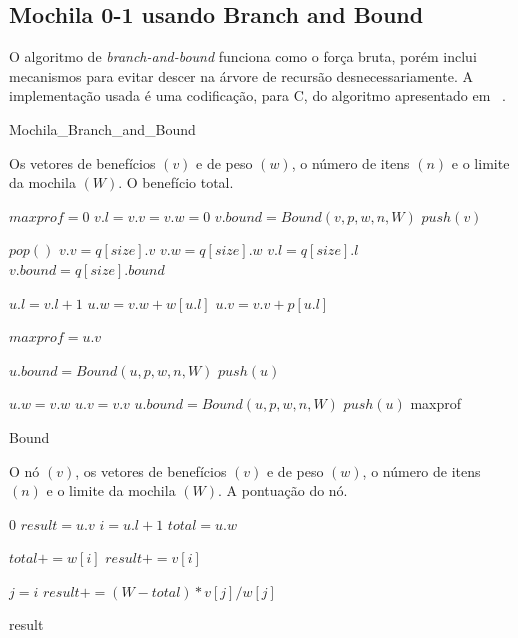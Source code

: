 \subsection{Mochila 0-1 usando Branch and Bound}

O algoritmo de \textit{branch-and-bound} funciona como o força bruta, porém inclui mecanismos para evitar descer na árvore de recursão desnecessariamente. A implementação usada é uma codificação, para C, do algoritmo apresentado em ~\cite{MTG02}.

\begin{algorithm}
\caption{Mochila\_Branch\_and\_Bound} %
\label{alg3}
\scriptsize
\begin{algorithmic}[1]

  \REQUIRE Os vetores de benefícios $(v)$ e de peso $(w)$, o número de itens $(n)$ e o limite da mochila $(W)$.
	\ENSURE O benefício total.

	\STATE $maxprof = 0$
  \STATE $v.l = v.v = v.w = 0$
  \STATE $v.bound = Bound(v, p, w, n, W)$
  \STATE $push(v)$


    \STATE $pop()$
    \STATE $v.v = q[size].v$
    \STATE $v.w = q[size].w$
    \STATE $v.l = q[size].l$
    \STATE $v.bound = q[size].bound$

      \STATE $u.l = v.l + 1$
      \STATE $u.w = v.w + w[u.l]$
      \STATE $u.v = v.v + p[u.l]$

				\STATE $maxprof = u.v$
			\ENDIF

      \STATE $u.bound = Bound(u, p, w, n, W)$
				\STATE $push(u)$
			\ENDIF

      \STATE $u.w = v.w$
      \STATE $u.v = v.v$
      \STATE $u.bound = Bound(u, p, w, n, W)$
				\STATE $push(u)$
			\ENDIF
    \ENDIF
  \ENDWHILE
  \RETURN maxprof

\end{algorithmic}
\end{algorithm}

\begin{algorithm}
\caption{Bound} %
\label{alg4}
\scriptsize
\begin{algorithmic}[1]
	\REQUIRE O nó $(v)$, os vetores de benefícios $(v)$ e de peso $(w)$, o número de itens $(n)$ e o limite da mochila $(W)$.
	\ENSURE A pontuação do nó.

    \RETURN $0$
  \ELSE
    \STATE $result = u.v$
    \STATE $i = u.l + 1$
    \STATE $total = u.w$

      \STATE $total += w[i]$
      \STATE $result += v[i]$
    \ENDWHILE

    \STATE $j = i$
			\STATE $result += (W - total) * v[j]/w[j]$
		\ENDIF

    \RETURN result
  \ENDIF

\end{algorithmic}
\end{algorithm}

